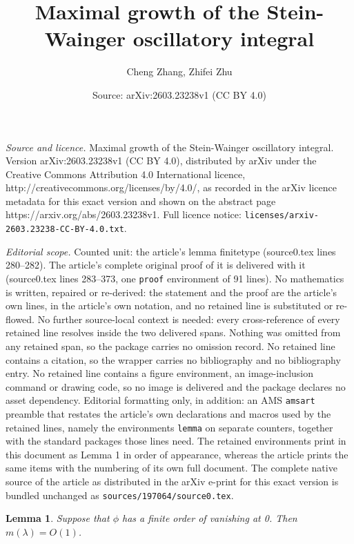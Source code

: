 \documentclass[10pt,a4paper]{amsart}
\title{Maximal growth of the Stein-Wainger oscillatory integral}
\author{Cheng Zhang, Zhifei Zhu}
\date{Source: arXiv:2603.23238v1 (CC BY 4.0)}
\newtheorem{lemma}{Lemma}
\newcommand{\la}{\lambda}
\begin{document}
\maketitle

\noindent\emph{Source and licence.} Maximal growth of the Stein-Wainger oscillatory integral. Version arXiv:2603.23238v1 (CC BY 4.0), distributed by arXiv under the Creative Commons Attribution 4.0 International licence, http://creativecommons.org/licenses/by/4.0/, as recorded in the arXiv licence metadata for this exact version and shown on the abstract page https://arxiv.org/abs/2603.23238v1. Full licence notice: \texttt{licenses/arxiv-2603.23238-CC-BY-4.0.txt}.\par\smallskip

\noindent\textit{Editorial scope.} Counted unit: the article's lemma finitetype (source0.tex lines 280--282). The article's complete original proof of it is delivered with it (source0.tex lines 283--373, one \texttt{proof} environment of 91 lines). No mathematics is written, repaired or re-derived: the statement and the proof are the article's own lines, in the article's own notation, and no retained line is substituted or re-flowed.  No further source-local context is needed: every cross-reference of every retained line resolves inside the two delivered spans.  Nothing was omitted from any retained span, so the package carries no omission record.  No retained line contains a citation, so the wrapper carries no bibliography and no bibliography entry.  No retained line contains a figure environment, an image-inclusion command or drawing code, so no image is delivered and the package declares no asset dependency.  Editorial formatting only, in addition: an AMS \texttt{amsart} preamble that restates the article's own declarations and macros used by the retained lines, namely the environments \texttt{lemma} on separate counters, together with the standard packages those lines need.  The retained environments print in this document as Lemma 1 in order of appearance, whereas the article prints the same items with the numbering of its own full document.  The complete native source of the article as distributed in the arXiv e-print for this exact version is bundled unchanged as \texttt{sources/197064/source0.tex}.
\begin{lemma}\label{finitetype}
	Suppose that $\phi$ has a finite order of vanishing at 0. Then $m(\la)=O(1)$.
\end{lemma}
\end{document}
